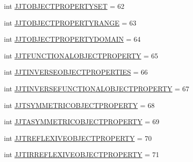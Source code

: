 \begin{DoxyCompactItemize}
\item 
int \hyperlink{interfaceorg_1_1coode_1_1owlapi_1_1functionalparser_1_1_o_w_l_functional_syntax_parser_tree_constants_a3b70d3753914a5f9eed579e6c2795ac7}{J\-J\-T\-O\-B\-J\-E\-C\-T\-P\-R\-O\-P\-E\-R\-T\-Y\-S\-E\-T} = 62
\item 
int \hyperlink{interfaceorg_1_1coode_1_1owlapi_1_1functionalparser_1_1_o_w_l_functional_syntax_parser_tree_constants_ad415d34a2415ad7c62dc0efdf64d2187}{J\-J\-T\-O\-B\-J\-E\-C\-T\-P\-R\-O\-P\-E\-R\-T\-Y\-R\-A\-N\-G\-E} = 63
\item 
int \hyperlink{interfaceorg_1_1coode_1_1owlapi_1_1functionalparser_1_1_o_w_l_functional_syntax_parser_tree_constants_a82f3c48386ccf11efd5e9401f2dd3f69}{J\-J\-T\-O\-B\-J\-E\-C\-T\-P\-R\-O\-P\-E\-R\-T\-Y\-D\-O\-M\-A\-I\-N} = 64
\item 
int \hyperlink{interfaceorg_1_1coode_1_1owlapi_1_1functionalparser_1_1_o_w_l_functional_syntax_parser_tree_constants_a23374ed5dad4494b0b08f933016a69a5}{J\-J\-T\-F\-U\-N\-C\-T\-I\-O\-N\-A\-L\-O\-B\-J\-E\-C\-T\-P\-R\-O\-P\-E\-R\-T\-Y} = 65
\item 
int \hyperlink{interfaceorg_1_1coode_1_1owlapi_1_1functionalparser_1_1_o_w_l_functional_syntax_parser_tree_constants_a7ba17cc3fd5854d09ba034a60c1b7112}{J\-J\-T\-I\-N\-V\-E\-R\-S\-E\-O\-B\-J\-E\-C\-T\-P\-R\-O\-P\-E\-R\-T\-I\-E\-S} = 66
\item 
int \hyperlink{interfaceorg_1_1coode_1_1owlapi_1_1functionalparser_1_1_o_w_l_functional_syntax_parser_tree_constants_afac265a6218c887ec0515aa84778aeb2}{J\-J\-T\-I\-N\-V\-E\-R\-S\-E\-F\-U\-N\-C\-T\-I\-O\-N\-A\-L\-O\-B\-J\-E\-C\-T\-P\-R\-O\-P\-E\-R\-T\-Y} = 67
\item 
int \hyperlink{interfaceorg_1_1coode_1_1owlapi_1_1functionalparser_1_1_o_w_l_functional_syntax_parser_tree_constants_aa67ea67dcf268db8e35840444a7cec01}{J\-J\-T\-S\-Y\-M\-M\-E\-T\-R\-I\-C\-O\-B\-J\-E\-C\-T\-P\-R\-O\-P\-E\-R\-T\-Y} = 68
\item 
int \hyperlink{interfaceorg_1_1coode_1_1owlapi_1_1functionalparser_1_1_o_w_l_functional_syntax_parser_tree_constants_ab48c76d83160f3f3daac9dc476afe937}{J\-J\-T\-A\-S\-Y\-M\-M\-E\-T\-R\-I\-C\-O\-B\-J\-E\-C\-T\-P\-R\-O\-P\-E\-R\-T\-Y} = 69
\item 
int \hyperlink{interfaceorg_1_1coode_1_1owlapi_1_1functionalparser_1_1_o_w_l_functional_syntax_parser_tree_constants_a31ecfdfb38da7022d000c536de974b3c}{J\-J\-T\-R\-E\-F\-L\-E\-X\-I\-V\-E\-O\-B\-J\-E\-C\-T\-P\-R\-O\-P\-E\-R\-T\-Y} = 70
\item 
int \hyperlink{interfaceorg_1_1coode_1_1owlapi_1_1functionalparser_1_1_o_w_l_functional_syntax_parser_tree_constants_a0f7e7452d91504b40fa66d83bcba5b3d}{J\-J\-T\-I\-R\-R\-E\-F\-L\-E\-X\-I\-V\-E\-O\-B\-J\-E\-C\-T\-P\-R\-O\-P\-E\-R\-T\-Y} = 71

\end{DoxyCompactItemize}
